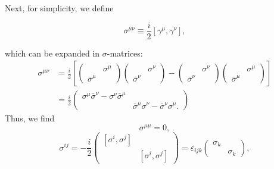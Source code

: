 \documentclass[11pt]{article}
\theoremstyle{definition}
\begin{document}
Next, for simplicity, we define
\begin{shaded}
    \begin{equation}
        \sigma^{\mu\nu} \equiv \frac{i}{2}[\gamma^\mu, \gamma^\nu],
    \end{equation}
\end{shaded}
which can be expanded in $\sigma$-matrices:
\begin{equation}
    \begin{aligned}
        \sigma^{\mu\nu} &= \frac{i}{2}\left[
        \begin{pmatrix}
            &\sigma^\mu\\
            \bar{\sigma}^\mu
        \end{pmatrix}
        \begin{pmatrix}
            &\sigma^\nu\\
            \bar{\sigma}^\nu
        \end{pmatrix}
        -
        \begin{pmatrix}
            &\sigma^\nu\\
            \bar{\sigma}^\nu
        \end{pmatrix}
        \begin{pmatrix}
            &\sigma^\mu\\
            \bar{\sigma}^\mu
        \end{pmatrix}\right]\\
        &= \frac{i}{2}
        \begin{pmatrix}
            \sigma^\mu\bar{\sigma}^\nu - \sigma^\nu\bar{\sigma}^\mu & \\
            & \bar{\sigma}^\mu\sigma^\nu - \bar{\sigma}^\nu\sigma^\mu.
        \end{pmatrix}
    \end{aligned}
\end{equation}
Thus, we find
\begin{equation}
    \sigma^{\mu\mu} = 0,
\end{equation}
\begin{equation}
    \sigma^{ij} = -\frac{i}{2}
    \begin{pmatrix}
        [\sigma^i, \sigma^j]& \\
        & [\sigma^i, \sigma^j]
    \end{pmatrix}
    =\varepsilon_{ijk}
    \begin{pmatrix}
        \sigma_k & \\
        & \sigma_k
    \end{pmatrix},
\end{equation}
\end{document}
